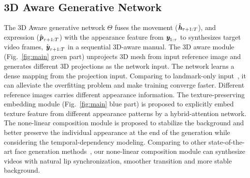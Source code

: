 \documentclass[runningheads]{llncs}
\def\mathbi#1{\textbf{\em #1}}
\providecommand{\CXu}[1]{\textcolor{red}{[{\bf #1}]}}
\begin{document}
\subsection{3D Aware Generative Network}
\label{subsec:3dgenerator}
The 3D Aware generative network $\Theta$ fuses the movement ($\hat{\mathbi{h}}_{\tau + 1:T}$), and expression ($\hat{\mathbi{p}}_{\tau + 1:T}$) with the appearance feature from ${\mathbi{y}}_{1:\tau }$ to synthesizes target
video frames, $\hat{\mathbi{y}}_{\tau + 1:T}$ in a sequential 3D-aware manual. The 3D aware module (Fig.~\ref{fig:main} green part) unprojects 3D mesh from input reference image and generates different 3D projections as the network input. The network learns a dense mapping from the projection input. Comparing to landmark-only input~\cite{zakharov2019few,wang2018fewshotvid2vid,wang2018high}, it can alleviate the overfitting problem and make training converge faster. Different reference images carries different appearance information. The texture-preserving embedding module (Fig.~\ref{fig:main} blue part) is proposed to explicitly embed texture feature from different  appearance patterns by a hybrid-attention network. The none-linear composition module is proposed to stabilize the background and better preserve the individual appearance at the end of the generation while considering the temporal-dependency modeling. Comparing to other state-of-the-art face generation methods~\cite{chung2017you,pumarola2019ganimation,zhou2019talking,zakharov2019few,wang2018high}, our none-linear composition module can synthesize videos with natural lip synchronization, smoother transition and more stable background.




\end{document}
